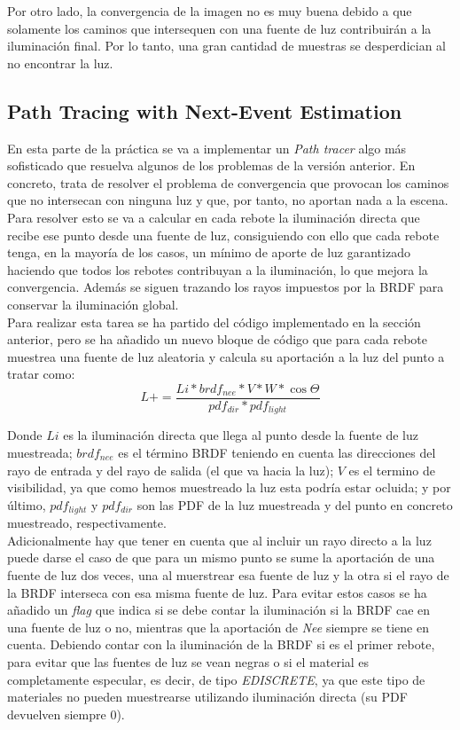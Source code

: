 \documentclass[10pt,oneside,a4paper]{article}
\begin{document}
Por otro lado, la convergencia de la imagen no es muy buena debido a que solamente los caminos que intersequen con una fuente de luz contribuirán a la iluminación final. Por lo tanto, una gran cantidad de muestras se desperdician al no encontrar la luz.

\subsection{Path Tracing with Next-Event Estimation}
En esta parte de la práctica se va a implementar un \textit{Path tracer} algo más sofisticado que resuelva algunos de los problemas de la versión anterior. En concreto, trata de resolver el problema de convergencia que provocan los caminos que no intersecan con ninguna luz y que, por tanto, no aportan nada a la escena. Para resolver esto se va a calcular en cada rebote la iluminación directa que recibe ese punto desde una fuente de luz, consiguiendo con ello que cada rebote tenga, en la mayoría de los casos, un mínimo de aporte de luz garantizado haciendo que todos los rebotes contribuyan a la iluminación, lo que mejora la convergencia. Además se siguen trazando los rayos impuestos por la BRDF para conservar la iluminación global.\\

Para realizar esta tarea se ha partido del código implementado en la sección anterior, pero se ha añadido un nuevo bloque de código que para cada rebote muestrea una fuente de luz aleatoria y calcula su aportación a la luz del punto a tratar como:
$$ L += \frac{Li * brdf_{nee} * V * W * \cos\Theta}{pdf_{dir} * pdf_{light}}$$

Donde $Li$ es la iluminación directa que llega al punto desde la fuente de luz muestreada; $brdf_{nee}$ es el término BRDF teniendo en cuenta las direcciones del rayo de entrada y del rayo de salida (el que va hacia la luz); $V$ es el termino de visibilidad, ya que como hemos muestreado la luz esta podría estar ocluida; y por último, $pdf_{light}$ y $pdf_{dir}$ son las PDF de la luz muestreada y del punto en concreto muestreado, respectivamente. \\

Adicionalmente hay que tener en cuenta que al incluir un rayo directo a la luz puede darse el caso de que para un mismo punto se sume la aportación de una fuente de luz dos veces, una al muerstrear esa fuente de luz y la otra si el rayo de la BRDF interseca con esa misma fuente de luz. Para evitar estos casos se ha añadido un \textit{flag} que indica si se debe contar la iluminación si la BRDF cae en una fuente de luz o no, mientras que la aportación de \textit{Nee} siempre se tiene en cuenta. Debiendo contar con la iluminación de la BRDF si es el primer rebote, para evitar que las fuentes de luz se vean negras o si el material es completamente especular, es decir, de tipo \textit{EDISCRETE}, ya que este tipo de materiales no pueden muestrearse utilizando iluminación directa (su  PDF devuelven siempre 0).\\
\end{document}
